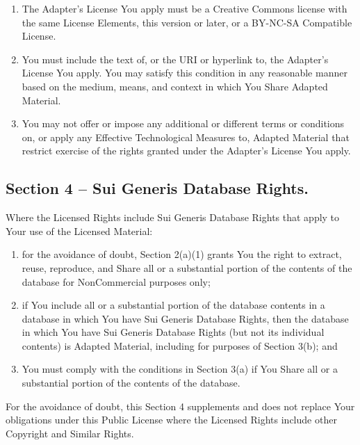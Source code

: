 \documentclass[]{book}
\begin{document}
\begin{enumerate}
\def\labelenumi{\arabic{enumi}.}
\item
  The Adapter's License You apply must be a Creative Commons license with the same License Elements, this version or later, or a BY-NC-SA Compatible License.
\item
  You must include the text of, or the URI or hyperlink to, the Adapter's License You apply. You may satisfy this condition in any reasonable manner based on the medium, means, and context in which You Share Adapted Material.
\item
  You may not offer or impose any additional or different terms or conditions on, or apply any Effective Technological Measures to, Adapted Material that restrict exercise of the rights granted under the Adapter's License You apply.
\end{enumerate}

\hypertarget{section-4-sui-generis-database-rights.}{%
\subsection{Section 4 -- Sui Generis Database Rights.}\label{section-4-sui-generis-database-rights.}}

Where the Licensed Rights include Sui Generis Database Rights that apply to Your use of the Licensed Material:

\begin{enumerate}
\def\labelenumi{\alph{enumi}.}
\item
  for the avoidance of doubt, Section 2(a)(1) grants You the right to extract, reuse, reproduce, and Share all or a substantial portion of the contents of the database for NonCommercial purposes only;
\item
  if You include all or a substantial portion of the database contents in a database in which You have Sui Generis Database Rights, then the database in which You have Sui Generis Database Rights (but not its individual contents) is Adapted Material, including for purposes of Section 3(b); and
\item
  You must comply with the conditions in Section 3(a) if You Share all or a substantial portion of the contents of the database.
\end{enumerate}

For the avoidance of doubt, this Section 4 supplements and does not replace Your obligations under this Public License where the Licensed Rights include other Copyright and Similar Rights.
\end{document}
